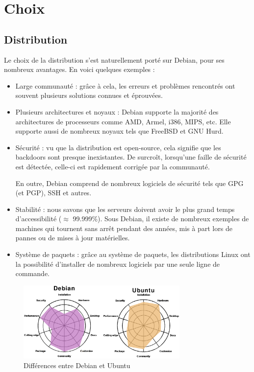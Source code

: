\section{Choix}
\label{sec:choix}

\subsection{Distribution}
\label{subsec:distribution}

Le choix de la distribution s'est naturellement porté sur Debian, pour ses
nombreux avantages. En voici quelques exemples :
\begin{itemize}
\item Large communauté : grâce à cela, les erreurs et problèmes rencontrés ont
  souvent plusieurs solutions connues et éprouvées.

\item Plusieurs architectures et noyaux : Debian supporte la majorité des
  architectures de processeurs comme AMD, Armel, i386, MIPS, etc. Elle supporte
  aussi de nombreux noyaux tels que FreeBSD et GNU Hurd.

\item Sécurité : vu que la distribution est open-source, cela signifie que les
  backdoors sont presque inexistantes. De surcroît, lorsqu'une faille de sécurité
  est détectée, celle-ci est rapidement corrigée par la communauté.

  En outre, Debian comprend de nombreux logiciels de sécurité tels que GPG (et
  PGP), SSH et autres.

\item Stabilité : nous savons que les serveurs doivent avoir le plus grand temps
  d'accessibilité ($\approx$ 99.999\%). Sous Debian, il existe de nombreux exemples de
  machines qui tournent sans arrêt pendant des années, mis à part lors de pannes
  ou de mises à jour matérielles.

\item Système de paquets : grâce au système de paquets, les distributions Linux
  ont la possibilité d'installer de nombreux logiciels par une seule ligne de
  commande.
\end{itemize}

\begin{figure}[!h]
  \centering
  \includegraphics[width=0.75\textwidth]
  {textures/images/installation/DebianVsUbuntu.eps}
  \caption{Différences entre Debian et Ubuntu}
  \label{fig:diff-debian-ubuntu}
\end{figure}

